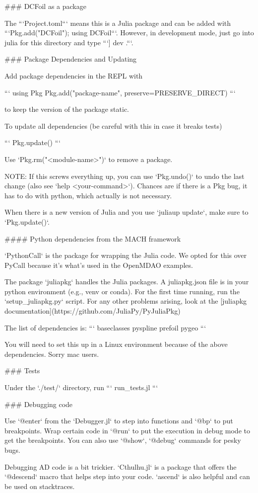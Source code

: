 \documentclass[10pt]{article}
\begin{document}
### DCFoil as a package

The ```Project.toml``` means this is a Julia package and can be added with ```Pkg.add("DCFoil"); using DCFoil```. However, in development mode, just go into julia for this directory and type ```] dev .```.

### Package Dependencies and Updating

Add package dependencies in the REPL with

```
using Pkg
Pkg.add("package-name", preserve=PRESERVE_DIRECT)
```

to keep the version of the package static.

To update all dependencies (be careful with this in case it breaks tests)

```
Pkg.update()
```

Use `Pkg.rm("<module-name>")` to remove a package.

NOTE: If this screws everything up, you can use `Pkg.undo()` to undo the last change (also see `help <your-command>`).
Chances are if there is a Pkg bug, it has to do with python, which actually is not necessary.

When there is a new version of Julia and you use `juliaup update`, make sure to `Pkg.update()`.


#### Python dependencies from the MACH framework

`PythonCall` is the package for wrapping the Julia code.
We opted for this over PyCall because it's what's used in the OpenMDAO examples.

The package `juliapkg` handles the Julia packages.
A juliapkg.json file is in your python environment (e.g., venv or conda).
For the first time running, run the `setup_juliapkg.py` script.
For any other problems arising, look at the [juliapkg documentation](https://github.com/JuliaPy/PyJuliaPkg)

The list of dependencies is:
```
baseclasses
pyspline
prefoil
pygeo
```

You will need to set this up in a Linux environment because of the above dependencies. Sorry mac users.

### Tests

Under the `./test/` directory, run
```
run_tests.jl
```

### Debugging code

Use `@enter` from the `Debugger.jl` to step into functions and `@bp` to put breakpoints.
Wrap certain code in `@run` to put the execution in debug mode to get the breakpoints.
You can also use `@show`, `@debug` commands for pesky bugs.

Debugging AD code is a bit trickier.
`Cthulhu.jl` is a package that offers the `@descend` macro that helps step into your code.
`ascend` is also helpful and can be used on stacktraces.
\end{document}

